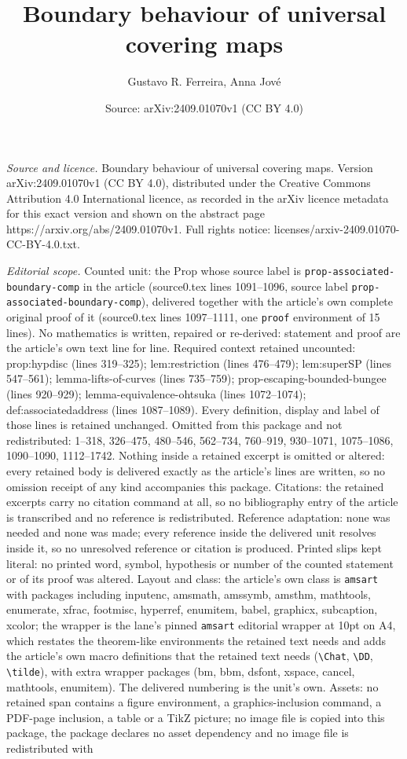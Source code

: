 \documentclass[10pt,a4paper]{amsart}
\title[Boundary behaviour of universal covering maps]{Boundary behaviour of universal covering maps}
\author{Gustavo R. Ferreira, Anna Jov\'e}
\date{Source: arXiv:2409.01070v1 (CC BY 4.0)}
\begin{document}
\maketitle

\noindent\emph{Source and licence.} Boundary behaviour of universal covering maps. Version arXiv:2409.01070v1 (CC BY 4.0), distributed under the Creative Commons Attribution 4.0 International licence, as recorded in the arXiv licence metadata for this exact version and shown on the abstract page https://arxiv.org/abs/2409.01070v1. Full rights notice: licenses/arxiv-2409.01070-CC-BY-4.0.txt.\par\smallskip

\noindent\textit{Editorial scope.} Counted unit: the Prop whose source label is \texttt{prop-associated-boundary-comp} in the article (source0.tex lines 1091--1096, source label \texttt{prop-associated-boundary-comp}), delivered together with the article's own complete original proof of it (source0.tex lines 1097--1111, one \texttt{proof} environment of 15 lines). No mathematics is written, repaired or re-derived: statement and proof are the article's own text line for line. Required context retained uncounted: prop:hypdisc (lines 319--325); lem:restriction (lines 476--479); lem:superSP (lines 547--561); lemma-lifts-of-curves (lines 735--759); prop-escaping-bounded-bungee (lines 920--929); lemma-equivalence-ohtsuka (lines 1072--1074); def:associatedaddress (lines 1087--1089). Every definition, display and label of those lines is retained unchanged. Omitted from this package and not redistributed: 1--318, 326--475, 480--546, 562--734, 760--919, 930--1071, 1075--1086, 1090--1090, 1112--1742. Nothing inside a retained excerpt is omitted or altered: every retained body is delivered exactly as the article's lines are written, so no omission receipt of any kind accompanies this package. Citations: the retained excerpts carry no citation command at all, so no bibliography entry of the article is transcribed and no reference is redistributed. Reference adaptation: none was needed and none was made; every reference inside the delivered unit resolves inside it, so no unresolved reference or citation is produced. Printed slips kept literal: no printed word, symbol, hypothesis or number of the counted statement or of its proof was altered. Layout and class: the article's own class is \texttt{amsart} with packages including inputenc, amsmath, amssymb, amsthm, mathtools, enumerate, xfrac, footmisc, hyperref, enumitem, babel, graphicx, subcaption, xcolor; the wrapper is the lane's pinned \texttt{amsart} editorial wrapper at 10pt on A4, which restates the theorem-like environments the retained text needs and adds the article's own macro definitions that the retained text needs (\texttt{\textbackslash Chat}, \texttt{\textbackslash DD}, \texttt{\textbackslash tilde}), with extra wrapper packages (bm, bbm, dsfont, xspace, cancel, mathtools, enumitem). The delivered numbering is the unit's own. Assets: no retained span contains a figure environment, a graphics-inclusion command, a PDF-page inclusion, a table or a TikZ picture; no image file is copied into this package, the package declares no asset dependency and no image file is redistributed with 
\end{document}
